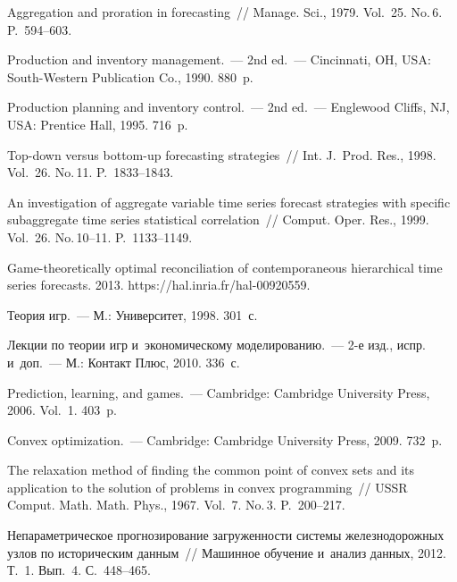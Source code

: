 \begin{multicols}{2}
{{\begin{thebibliography}{99}
 Aggregation and proration in forecasting~// Manage.
    Sci., 1979. Vol.~25. No.\,6. P.~594--603.

 Production and inventory
    management.~--- 2nd ed.~--- Cincinnati, OH, USA: South-Western Publication Co.,
    1990. 880~p.

 Production planning and inventory
    control.~--- 2nd ed.~--- Englewood Cliffs, NJ, USA: Prentice Hall,
    1995. 716~p.

 Top-down versus bottom-up forecasting
    strategies~// Int. J.~Prod. Res., 1998.
    Vol.~26. No.\,11. P.~1833--1843.

 An investigation of aggregate variable time series forecast strategies with
    specific subaggregate time series statistical correlation~//
    Comput. Oper. Res., 1999. Vol.~26. No.\,10--11.
    P.~1133--1149.

  Game-theoretically optimal reconciliation of contemporaneous
    hierarchical time series forecasts. 2013.
    {\sf https://hal.inria.fr/hal-00920559}.



Теория игр.~--- М.: Университет, 1998. 301~с.

 Лекции по теории игр и~экономическому моделированию.~--- 2-е
    изд., испр. и~доп.~---
    М.: Контакт Плюс, 2010. 336~с.

 Prediction, learning, and games.~--- Cambridge: Cambridge
    University Press, 2006. Vol.~1. 403~p.

 Convex optimization.~---
Cambridge: Cambridge University Press, 2009. 732~p.

 The relaxation method of finding the common point of convex sets and its
    application to the solution of problems in convex programming~//
    USSR Comput. Math. Math. Phys.,
    1967. Vol.~7. No.\,3. P.~200--217.

 Непараметрическое прогнозирование загруженности системы железнодорожных
    узлов по историческим данным~// Машинное обучение и~анализ данных, 2012. Т.~1. Вып.~4. С.~448--465.
     \end{thebibliography}

 }
 }

\end{multicols}

